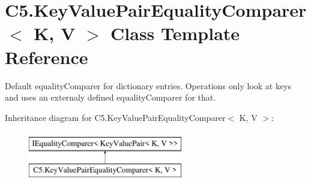 \hypertarget{class_c5_1_1_key_value_pair_equality_comparer}{}\section{C5.\+Key\+Value\+Pair\+Equality\+Comparer$<$ K, V $>$ Class Template Reference}
\label{class_c5_1_1_key_value_pair_equality_comparer}


Default equality\+Comparer for dictionary entries. Operations only look at keys and uses an externaly defined equality\+Comparer for that.  


Inheritance diagram for C5.\+Key\+Value\+Pair\+Equality\+Comparer$<$ K, V $>$\+:\begin{figure}[H]
\begin{center}
\leavevmode
\includegraphics[height=2.000000cm]{class_c5_1_1_key_value_pair_equality_comparer}
\end{center}
\end{figure}
